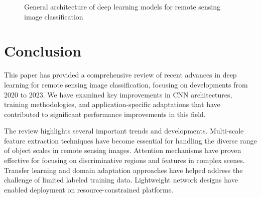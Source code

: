 \documentclass[12pt,a4paper]{article}
\begin{document}
\begin{figure}[htbp]
\centering
{}
\caption{General architecture of deep learning models for remote sensing image classification}
\label{fig:architecture}
\end{figure}

\section{Conclusion}
\label{sec:conclusion}

This paper has provided a comprehensive review of recent advances in deep learning for remote sensing image classification, focusing on developments from 2020 to 2023. We have examined key improvements in CNN architectures, training methodologies, and application-specific adaptations that have contributed to significant performance improvements in this field.

The review highlights several important trends and developments. Multi-scale feature extraction techniques have become essential for handling the diverse range of object scales in remote sensing images. Attention mechanisms have proven effective for focusing on discriminative regions and features in complex scenes. Transfer learning and domain adaptation approaches have helped address the challenge of limited labeled training data. Lightweight network designs have enabled deployment on resource-constrained platforms.
\end{document}
